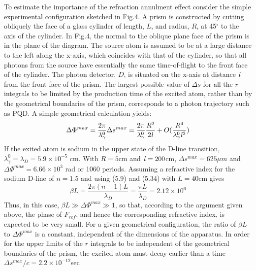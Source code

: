 {     \par To estimate the importance of the refraction annulment effect consider
      the simple experimental configuration sketched in Fig.4. A prism is constructed
     by cutting obliquely the face of a glass cylinder of length, $L$,
     and radius, $R$, at 45$^\circ$ to the axis of the 
     cylinder. In Fig.4, the normal to the oblique plane face
     of the prism is in the plane of the diagram. The source atom is assumed to be 
     at a large distance to the left along the x-axis, which coincides with that 
     of the cylinder, so that all photons from the source have essentially the 
     same time-of-flight to the front face of the cylinder. The photon detector,
     $D$, is situated on the x-axis at distance ${\it l}$ from the front face of
     the prism. The largest possible value of $\Delta s$ for all the $r$ integrals
     to be limited by the production time of the excited atom, rather than by
     the geometrical boundaries of the prism, corresponds to a photon
     trajectory such as PQD. A simple geometrical calculation yields:
     \begin{equation}
      \Delta \Phi^{max} = \frac{2 \pi}{\lambda_{\gamma}^0}\Delta s^{max}
        =  \frac{2 \pi}{\lambda_{\gamma}^0}\frac{R^2}{2 {\it l}}+ O(\frac{R^4}{\lambda_{\gamma}^0{\it l}^3})
     \end{equation}
     If the exited atom is sodium in the upper state of the D-line transition,
      $\lambda_{\gamma}^0 = \lambda_{D} = 5.9 \times 10^{-5}$ cm. With $R = 5$cm
     and ${\it l} = 200$cm, $\Delta s^{max} = 625\mu m$ and $ \Delta \Phi^{max} = 
     6.66 \times 10^3$ rad or 1060 periods. Assuming a refractive index for
     the sodium D-line of $n = 1.5$ and using (5.9) and (5.34) with
     $L = 40$cm gives
    \begin{equation}
     \beta L = \frac{2\pi(n-1) L}{\lambda_D} = \frac{\pi L}{\lambda_D} = 2.12 \times 10^6
    \end{equation}
     Thus, in this case, $\beta L \gg  \Delta \Phi^{max} \gg 1$, so that,
       according to the argument given above,
     the phase of $F_{ref}$, and hence the corresponding refractive index, is expected to be
     very small. For a given
     geometrical configuration, the ratio of $\beta L$ to $\Delta \Phi^{max}$
     is a constant, independent of the dimensions of the apparatus.
     In order for the upper limits of the $r$ integrals to be independent of
     the geometrical boundaries of the prism, the excited atom
     must decay earlier than a time $\Delta s^{max}/c = 2.2 \times 10^{-12}$sec
}
